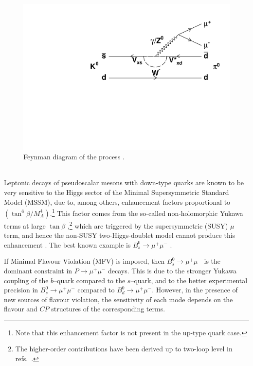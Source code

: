 \begin{figure} [htb!]
\begin{center}
\includegraphics[scale=0.5]{figs/ks_pi0mumu.pdf}
\caption{Feynman diagram of the process \Kzpizmm. \label{fig:diagram}}
\end{center}
\end{figure}

\\
Leptonic decays of pseudoscalar mesons with down-type quarks are known to be very sensitive to the Higgs sector of the Minimal Supersymmetric Standard Model (MSSM), due to, among others, enhancement factors proportional to $\left(\tan^6\beta/M_A^4\right)$.\footnote{Note that this enhancement factor is not present in the up-type quark case.} 
This factor comes from the so-called non-holomorphic Yukawa terms at large $\tan \beta$ \cite{Hamzaoui:1998nu,Babu:1999hn,Chankowski:2000ng,Bobeth:2001sq,Isidori:2001fv,Isidori:2002qe},\footnote{
The higher-order contributions have been derived up to two-loop level in refs.~\cite{Crivellin:2010er, Crivellin:2011jt, Crivellin:2012zz}.} which are triggered by the supersymmetric (SUSY) $\mu$ term, and hence the non-SUSY two-Higgs-doublet model cannot produce this enhancement \cite{Isidori:2001fv}. The best known example is $B_s^0\rightarrow\mu^+\mu^-$ \cite{Hamzaoui:1998nu,Babu:1999hn,Chankowski:2000ng,Bobeth:2001sq, Isidori:2001fv,Isidori:2002qe,Choudhury:1998ze,Huang:2000sm,Xiong:2001up,Dedes:2001fv,Bobeth:2002ch,Baek:2002rt,Dedes:2002zx, Mizukoshi:2002gs,Baek:2002wm}. 

If Minimal Flavour Violation (MFV) is imposed, then $B_s^0\rightarrow\mu^+\mu^-$ is the dominant constraint in $P\rightarrow\mu^+\mu^-$ decays. This is due to the stronger Yukawa coupling of the $b$--quark compared to the $s$--quark, and to the better experimental precision in $B_s^0\rightarrow\mu^+\mu^-$ compared to $B_d^0\rightarrow\mu^+\mu^-$. However, in the presence of new sources of flavour violation, the sensitivity of each mode depends on the flavour and $CP$ structures of the corresponding terms.

